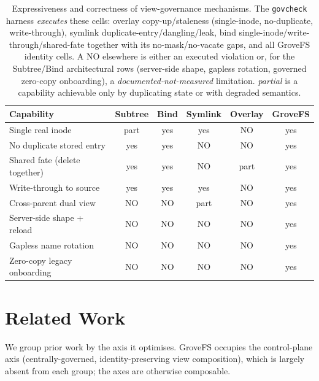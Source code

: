 \documentclass[numberedsection,acmtos]{acmart}
\begin{document}
\begin{table}[t]
\caption{Expressiveness and correctness of view-governance mechanisms. The
\texttt{govcheck} harness \emph{executes} these cells: overlay copy-up/staleness
(single-inode, no-duplicate, write-through), symlink duplicate-entry/dangling/leak,
bind single-inode/write-through/shared-fate together with its no-mask/no-vacate
gaps, and all GroveFS identity cells. A NO elsewhere is either an executed
violation or, for the Subtree/Bind architectural rows (server-side shape, gapless
rotation, governed zero-copy onboarding), a \emph{documented-not-measured}
limitation. \emph{partial} is a capability achievable only by duplicating state or
with degraded semantics.}
\label{tab:expr}
\begin{tabular}{lccccc}
\toprule
Capability & Subtree & Bind & Symlink & Overlay & GroveFS \\
\midrule
Single real inode             & part & yes & yes & NO     & yes \\
No duplicate stored entry     & yes  & yes & NO  & NO     & yes \\
Shared fate (delete together) & yes  & yes & NO  & part   & yes \\
Write-through to source       & yes  & yes & yes & NO     & yes \\
Cross-parent dual view        & NO   & NO  & part& NO     & yes \\
Server-side shape + reload    & NO   & NO  & NO  & NO     & yes \\
Gapless name rotation         & NO   & NO  & NO  & NO     & yes \\
Zero-copy legacy onboarding   & NO   & NO  & NO  & NO     & yes \\
\bottomrule
\end{tabular}
\end{table}

\section{Related Work}
\label{sec:related}
We group prior work by the axis it optimises. GroveFS occupies the
control-plane axis (centrally-governed, identity-preserving view composition),
which is largely absent from each group; the axes are otherwise composable.
\end{document}
